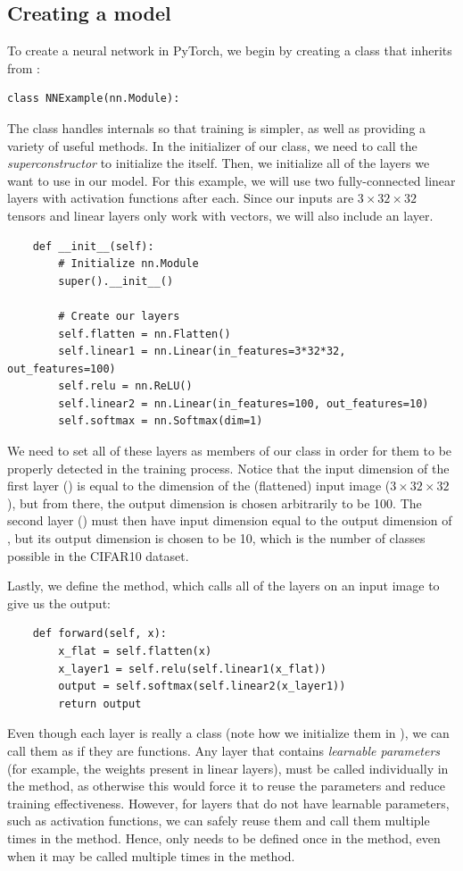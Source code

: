 \subsection*{Creating a model}
To create a neural network in PyTorch, we begin by creating a class that inherits from :
\begin{lstlisting}
class NNExample(nn.Module):
\end{lstlisting}
The class  handles internals so that training is simpler, as well as providing a variety of useful methods.
In the initializer of our class, we need to call the \emph{superconstructor}  to initialize the  itself.
Then, we initialize all of the layers we want to use in our model.
For this example, we will use two fully-connected linear layers with activation functions after each.
Since our inputs are \(3\times32\times32\) tensors and linear layers only work with vectors, we will also include an  layer.
\begin{lstlisting}
    def __init__(self):
        # Initialize nn.Module
        super().__init__()
        
        # Create our layers
        self.flatten = nn.Flatten()
        self.linear1 = nn.Linear(in_features=3*32*32, out_features=100)
        self.relu = nn.ReLU()
        self.linear2 = nn.Linear(in_features=100, out_features=10)
        self.softmax = nn.Softmax(dim=1)
\end{lstlisting}
We need to set all of these layers as members of our class in order for them to be properly detected in the training process.
Notice that the input dimension of the first layer () is equal to the dimension of the (flattened) input image ($3\times32\times32$), but from there, the output dimension is chosen arbitrarily to be 100.
The second layer () must then have input dimension equal to the output dimension of , but its output dimension is chosen to be 10, which is the number of classes possible in the CIFAR10 dataset.

Lastly, we define the  method, which calls all of the layers on an input image to give us the output:
\begin{lstlisting}
    def forward(self, x):
        x_flat = self.flatten(x)
        x_layer1 = self.relu(self.linear1(x_flat))
        output = self.softmax(self.linear2(x_layer1))
        return output
\end{lstlisting}
Even though each layer is really a class (note how we initialize them in ), we can call them as if they are functions.
Any layer that contains \emph{learnable parameters} (for example, the weights present in linear layers), must be called individually in the  method, as otherwise this would force it to reuse the parameters and reduce training effectiveness.
However, for layers that do not have learnable parameters, such as activation functions, we can safely reuse them and call them multiple times in the  method.
Hence,  only needs to be defined once in the  method, even when it may be called multiple times in the  method.

